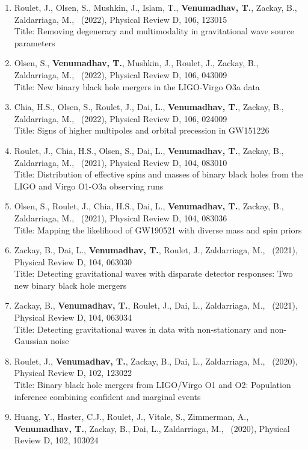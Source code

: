 \documentclass{article}
\newlength{\cvindent}
\newenvironment{cvlist}{%
  \begin{list}{}{%
    \setlength{\leftmargin}{\cvindent}%
    \setlength{\rightmargin}{0pt}%
    \setlength{\topsep}{0pt}%
    \setlength{\partopsep}{0pt}%
    \setlength{\parsep}{0pt}%
    \setlength{\itemsep}{0pt}%
  }%
  \item\relax
}{%
  \end{list}
}
\begin{document}
\begin{cvlist}
\begin{enumerate}[leftmargin=*,itemsep=0.32em,topsep=0.3em]
\item Roulet, J., Olsen, S., Mushkin, J., Islam, T., \textbf{Venumadhav, T.}, Zackay, B., Zaldarriaga, M., \ (2022), Physical Review D, 106, 123015 \\
Title: Removing degeneracy and multimodality in gravitational wave source parameters
\item Olsen, S., \textbf{Venumadhav, T.}, Mushkin, J., Roulet, J., Zackay, B., Zaldarriaga, M., \ (2022), Physical Review D, 106, 043009 \\
Title: New binary black hole mergers in the LIGO-Virgo O3a data
\item Chia, H.S., Olsen, S., Roulet, J., Dai, L., \textbf{Venumadhav, T.}, Zackay, B., Zaldarriaga, M., \ (2022), Physical Review D, 106, 024009 \\
Title: Signs of higher multipoles and orbital precession in GW151226
\item Roulet, J., Chia, H.S., Olsen, S., Dai, L., \textbf{Venumadhav, T.}, Zackay, B., Zaldarriaga, M., \ (2021), Physical Review D, 104, 083010 \\
Title: Distribution of effective spins and masses of binary black holes from the LIGO and Virgo O1-O3a observing runs
\item Olsen, S., Roulet, J., Chia, H.S., Dai, L., \textbf{Venumadhav, T.}, Zackay, B., Zaldarriaga, M., \ (2021), Physical Review D, 104, 083036 \\
Title: Mapping the likelihood of GW190521 with diverse mass and spin priors
\item Zackay, B., Dai, L., \textbf{Venumadhav, T.}, Roulet, J., Zaldarriaga, M., \ (2021), Physical Review D, 104, 063030 \\
Title: Detecting gravitational waves with disparate detector responses: Two new binary black hole mergers
\item Zackay, B., \textbf{Venumadhav, T.}, Roulet, J., Dai, L., Zaldarriaga, M., \ (2021), Physical Review D, 104, 063034 \\
Title: Detecting gravitational waves in data with non-stationary and non-Gaussian noise
\item Roulet, J., \textbf{Venumadhav, T.}, Zackay, B., Dai, L., Zaldarriaga, M., \ (2020), Physical Review D, 102, 123022 \\
Title: Binary black hole mergers from LIGO/Virgo O1 and O2: Population inference combining confident and marginal events
\item Huang, Y., Haster, C.J., Roulet, J., Vitale, S., Zimmerman, A., \textbf{Venumadhav, T.}, Zackay, B., Dai, L., Zaldarriaga, M., \ (2020), Physical Review D, 102, 103024 \\

\end{enumerate}
\end{cvlist}
\end{document}
